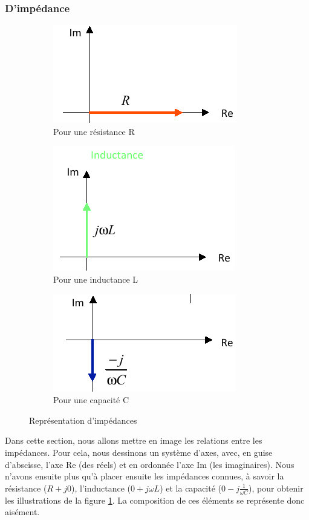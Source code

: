 \documentclass[12pt,a4paper]{article}
\begin{document}
\subsubsection{D'impédance}
\begin{figure}
	\centering
		\begin{subfigure}[b]{0.32\textwidth}
		\centering
		\includegraphics[scale=0.55]{images/diagramme_resistance}
		\caption{Pour une résistance R}
	\end{subfigure}
		\begin{subfigure}[b]{0.32\textwidth}
		\centering
		\includegraphics[scale=0.55]{images/diagramme_inductance}
		\caption{Pour une inductance L}
	\end{subfigure}
	\begin{subfigure}[b]{0.32\textwidth}
		\centering
		\includegraphics[scale=0.55]{images/diagramme_capacite}
		\caption{Pour une capacité C}
	\end{subfigure}
	\caption{Représentation d'impédances}
	\label{figs: representation impedance}
\end{figure}
Dans cette section, nous allons mettre en image les relations entre les impédances. Pour cela, nous dessinons un système d'axes, avec, en guise d'abscisse, l'axe Re (des réels) et en ordonnée l'axe Im (les imaginaires). Nous n'avons ensuite plus qu'à placer ensuite les impédances connues, à savoir la résistance ($R + j0$), l'inductance ($0 + j\omega L$) et la capacité ($0 -j\frac{1}{\omega C}$), pour obtenir les illustrations de la figure 	\ref{figs: representation impedance}. La composition de ces éléments se représente donc aisément.
\end{document}
